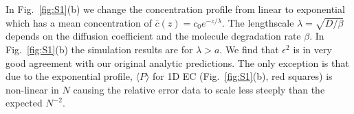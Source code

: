 In Fig.\ \ref{fig:S1}(b) we change the concentration profile from linear to exponential which has a mean concentration of
$\bar{c}(z) = c_0 e^{-z/\lambda}$.
The lengthscale $\lambda=\sqrt{D/\beta}$ depends on the diffusion coefficient and the molecule degradation rate $\beta$. In Fig.\ \ref{fig:S1}(b) the simulation results are for $\lambda > a$. We find that $\epsilon^2$ is in very good agreement with our original analytic predictions. The only exception is that due to the exponential profile, $\langle P \rangle$ for 1D EC (Fig.\ \ref{fig:S1}(b), red squares) is non-linear in $N$ causing the relative error data to scale less steeply than the expected $N^{-2}$.
